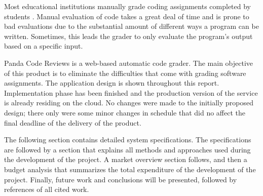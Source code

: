 
Most educational institutions manually grade coding assignments completed by
students \cite{Cheang2003}. Manual evaluation of code takes a great deal of time and is prone to
bad evaluations due to the substantial amount of different ways a program can be
written. Sometimes, this leads the grader to only evaluate the program's output
based on a specific input.

Panda Code Reviews is a web-based automatic code grader. The main objective of
this product is to eliminate the difficulties that come with grading software assignments.
The application design is shown throughout this report. Implementation
phase has been finished and the production version of the service is already
residing on the cloud. No changes were made to the initially proposed design;
there only were some minor changes in schedule that did no affect the final deadline
of the delivery of the product.

The following section contains detailed system specifications.
The specifications are followed by a section that explains all methods and approaches
used during the development of the project. A market overview section follows, and then a budget analysis that summarizes the total expenditure of the
development of the project. Finally, future work and conclusions will be presented, followed
by references of all cited work.

